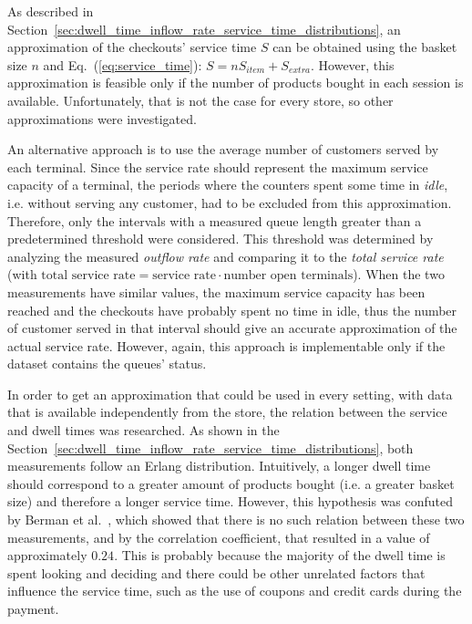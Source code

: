 As described in Section~\ref{sec:dwell_time_inflow_rate_service_time_distributions}, an approximation of the checkouts' service time \( S \) can be obtained using the basket size \( n \) and Eq.~(\ref{eq:service_time}): \( S = n S_{item} + S_{extra} \). However, this approximation is feasible only if the number of products bought in each session is available. Unfortunately, that is not the case for every store, so other approximations were investigated.

An alternative approach is to use the average number of customers served by each terminal. Since the service rate should represent the maximum service capacity of a terminal, the periods where the counters spent some time in \emph{idle}, i.e. without serving any customer, had to be excluded from this approximation. Therefore, only the intervals with a measured queue length greater than a predetermined threshold were considered. This threshold was determined by analyzing the measured \emph{outflow rate} and comparing it to the \emph{total service rate} (with \(\text{total service rate} = \text{service rate} \cdot \text{number open terminals} \)). When the two measurements have similar values, the maximum service capacity has been reached and the checkouts have probably spent no time in idle, thus the number of customer served in that interval should give an accurate approximation of the actual service rate. However, again, this approach is implementable only if the dataset contains the queues’ status.

In order to get an approximation that could be used in every setting, with data that is available independently from the store, the relation between the service and dwell times was researched. As shown in the Section~\ref{sec:dwell_time_inflow_rate_service_time_distributions}, both measurements follow an Erlang distribution. Intuitively, a longer dwell time should correspond to a greater amount of products bought (i.e. a greater basket size) and therefore a longer service time. However, this hypothesis was confuted by Berman et al.~\cite{berman}, which showed that there is no such relation between these two measurements, and by the correlation coefficient, that resulted in a value of approximately \( 0.24 \). This is probably because the majority of the dwell time is spent looking and deciding and there could be other unrelated factors that influence the service time, such as the use of coupons and credit cards during the payment.

